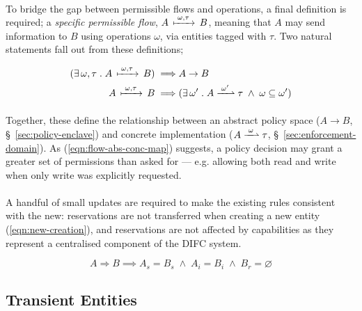 \paragraph{} To bridge the gap between permissible flows and operations, a final definition is required; a \textit{specific permissible flow}, $A \,\xmapsto{\;\omega,\tau\;}\, B$, meaning that $A$ may send information to $B$ using operations $\omega$, via entities tagged with $\tau$. Two natural statements fall out from these definitions;

\vspace{-7mm}
\begin{align}
    (\exists\, \omega,\tau \;.\; A \,\xmapsto{\;\omega,\tau\;}\, B) \implies & A \rightarrow B \\
    A \,\xmapsto{\;\omega,\tau\;}\, B \implies & (\exists \,\omega' \;.\; A \xrightharpoonup{\;\omega'\;} \tau \;\land\; \omega \subseteq \omega') \label{eqn:flow-abs-conc-map}
\end{align}

\paragraph{} Together, these define the relationship between an abstract policy space ($A \rightarrow B$, §~\ref{sec:policy-enclave}) and concrete implementation ($A \xrightharpoonup{\;\omega\;} \tau$, §~\ref{sec:enforcement-domain}). As (\ref{eqn:flow-abs-conc-map}) suggests, a policy decision may grant a greater set of permissions than asked for --- e.g. allowing both read and write when only write was explicitly requested.~\cite{flume,Zeldovich2008}

\paragraph{} A handful of small updates are required to make the existing rules consistent with the new: reservations are not transferred when creating a new entity (\ref{eqn:new-creation}), and reservations are not affected by capabilities as they represent a centralised component of the DIFC system. 

\vspace{-5mm}
\begin{equation}
    A \Rightarrow B \implies A_s = B_s \; \wedge \; A_i = B_i \; \wedge \; B_r = \varnothing \label{eqn:new-creation}
\end{equation}


\subsection{Transient Entities}
\label{sec:transient-entities}

